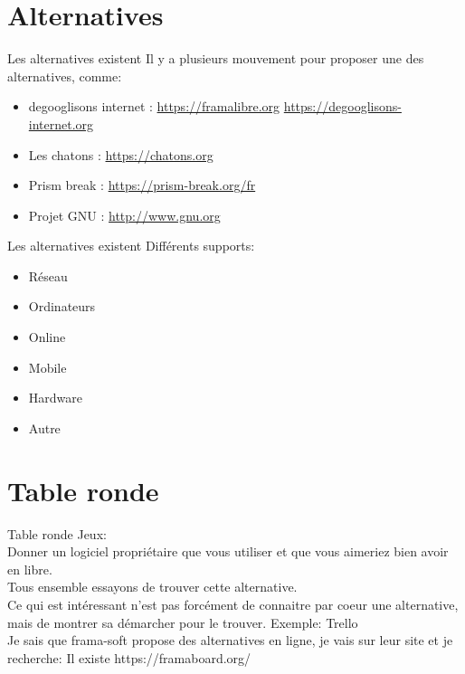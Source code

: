\documentclass{beamer}
\begin{document}

\section{Alternatives}
\begin{frame}{Les alternatives existent}
Il y a plusieurs mouvement pour proposer une des alternatives, comme:
\begin{itemize}
	\item degooglisons internet : \url{https://framalibre.org} \url{https://degooglisons-internet.org}
	\item Les chatons : \url{https://chatons.org}
	\item Prism break : \url{https://prism-break.org/fr}
	\item Projet GNU : \url{http://www.gnu.org}
\end{itemize}
\end{frame}

\begin{frame}{Les alternatives existent}
Différents supports:
\begin{itemize}
	\item Réseau
	\item Ordinateurs
	\item Online
	\item Mobile
	\item Hardware
	\item Autre
\end{itemize}
\end{frame}




\section{Table ronde}
\begin{frame}{Table ronde}
Jeux:\\
	Donner un logiciel propriétaire que vous utiliser et que vous aimeriez bien avoir en libre.\\
	Tous ensemble essayons de trouver cette alternative.\\
	Ce qui est intéressant n'est pas forcément de connaitre par coeur une alternative, mais de montrer sa démarcher pour le trouver.\newline
	\newline
	Exemple: Trello\\
	Je sais que frama-soft propose des alternatives en ligne, je vais sur leur site et je recherche: Il existe https://framaboard.org/
\end{frame}
\end{document}
